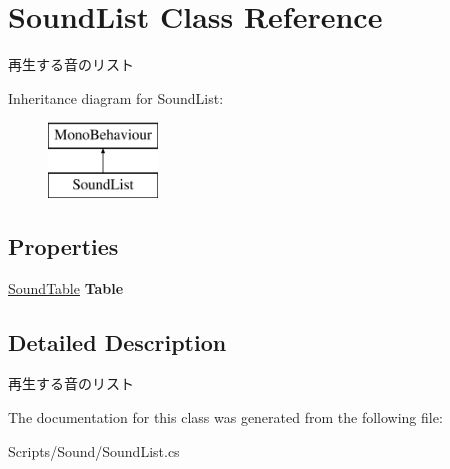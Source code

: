 \hypertarget{class_sound_list}{}\section{Sound\+List Class Reference}
\label{class_sound_list}


再生する音のリスト  


Inheritance diagram for Sound\+List\+:\begin{figure}[H]
\begin{center}
\leavevmode
\includegraphics[height=2.000000cm]{class_sound_list}
\end{center}
\end{figure}
\subsection*{Properties}
\begin{DoxyCompactItemize}
\item 
\hyperlink{class_sound_table}{Sound\+Table} {\bfseries Table}\hypertarget{class_sound_list_a3561841d0e853f881b3d3b91576551e3}{}\label{class_sound_list_a3561841d0e853f881b3d3b91576551e3}

\end{DoxyCompactItemize}


\subsection{Detailed Description}
再生する音のリスト 



The documentation for this class was generated from the following file\+:\begin{DoxyCompactItemize}
\item 
Scripts/\+Sound/Sound\+List.\+cs\end{DoxyCompactItemize}
